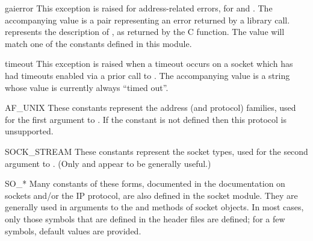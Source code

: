 \begin{excdesc}{gaierror}
This exception is raised for address-related errors, for
 and .
The accompanying value is a pair 
representing an error returned by a library call.
 represents the description of , as returned
by the  C function.
The  value will match one of the  constants
defined in this module.
\end{excdesc}

\begin{excdesc}{timeout}
This exception is raised when a timeout occurs on a socket which has
had timeouts enabled via a prior call to .  The
accompanying value is a string whose value is currently always ``timed
out''.
\end{excdesc}

\begin{datadesc}{AF_UNIX}
These constants represent the address (and protocol) families,
used for the first argument to .  If the
 constant is not defined then this protocol is
unsupported.
\end{datadesc}

\begin{datadesc}{SOCK_STREAM}
These constants represent the socket types,
used for the second argument to .
(Only  and
 appear to be generally useful.)
\end{datadesc}

\begin{datadesc}{SO_*}
Many constants of these forms, documented in the \UNIX{} documentation on
sockets and/or the IP protocol, are also defined in the socket module.
They are generally used in arguments to the  and
 methods of socket objects.  In most cases, only
those symbols that are defined in the \UNIX{} header files are defined;
for a few symbols, default values are provided.
\end{datadesc}

